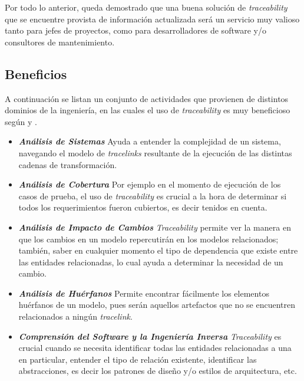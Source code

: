 \documentclass[a4paper,12pt,twoside,spanish,openright]{book}
\begin{document}
Por todo lo anterior, queda demostrado que una buena solución de \textit{traceability} que se encuentre provista de información actualizada será un servicio muy valioso tanto para jefes de proyectos, como para desarrolladores de software y/o consultores de mantenimiento.




\subsection{Beneficios}

A continuación se listan un conjunto de actividades que provienen de distintos dominios de la ingeniería, en las cuales el uso de \textit{traceability} es muy beneficioso según \cite{BrcinaRiebisch} y \cite{GrammelVoigt}.

\begin{itemize}

\item \textit{\textbf{Análisis de Sistemas}} Ayuda a entender la complejidad de un sistema, navegando el modelo de \textit{tracelinks} resultante de la ejecución de las distintas cadenas de transformación.

\item \textit{\textbf{Análisis de Cobertura}} Por ejemplo en el momento de ejecución de los casos de prueba, el uso de \textit{traceability} es crucial a la hora de determinar si todos los requerimientos fueron cubiertos, es decir tenidos en cuenta.

\item \textit{\textbf{Análisis de Impacto de Cambios}} \textit{Traceability} permite ver la manera en que los cambios en un modelo repercutirán en los modelos relacionados; también, saber en cualquier momento el tipo de dependencia que existe entre las entidades relacionadas, lo cual ayuda a determinar la necesidad de un cambio.

\item \textit{\textbf{Análisis de Huérfanos}} Permite encontrar fácilmente los elementos huérfanos de un modelo, pues serán aquellos artefactos que no se encuentren relacionados a ningún \textit{tracelink}.

\item \textit{\textbf{Comprensión del Software y la Ingeniería Inversa}} \textit{Traceability} es crucial cuando se necesita identificar todas las entidades relacionadas a una en particular, entender el tipo de relación existente, identificar las abstracciones, es decir los patrones de diseño y/o estilos de arquitectura, etc.


\end{itemize}
\end{document}
